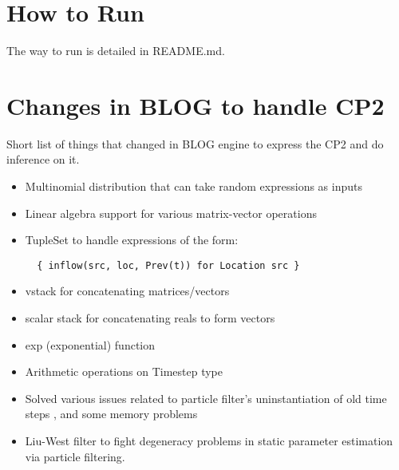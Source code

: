 \documentclass[11pt]{article}
\begin{document}
\section{How to Run}
The way to run is detailed in README.md. 

\section{Changes in BLOG to handle CP2}
Short list of things that changed in BLOG engine to express the CP2 and do inference on it.
\begin{itemize}
\item Multinomial distribution that can take random expressions as inputs
\item Linear algebra support for various matrix-vector operations
\item TupleSet to handle expressions of the form:
\begin{lstlisting}
  { inflow(src, loc, Prev(t)) for Location src }
\end{lstlisting}
\item vstack for concatenating matrices/vectors
\item scalar stack for concatenating reals to form vectors
\item exp (exponential) function
\item Arithmetic operations on Timestep type
\item Solved various issues related to particle filter's uninstantiation of old time steps , and some memory problems
\item Liu-West filter \cite{liu2001combined} to fight degeneracy problems in static parameter estimation via particle filtering.
\end{itemize}






\end{document}
